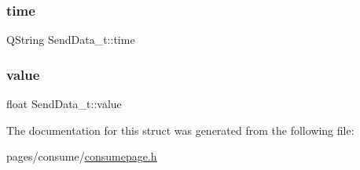 \subsubsection{\texorpdfstring{time}{time}}
{\footnotesize\ttfamily Q\+String Send\+Data\+\_\+t\+::time}

\mbox{\label{struct_send_data__t_a12f4d4700f5232b86c41e73082ded5ed}} 
\subsubsection{\texorpdfstring{value}{value}}
{\footnotesize\ttfamily float Send\+Data\+\_\+t\+::value}



The documentation for this struct was generated from the following file\+:\begin{DoxyCompactItemize}
\item 
pages/consume/\mbox{\hyperlink{consumepage_8h}{consumepage.\+h}}\end{DoxyCompactItemize}
